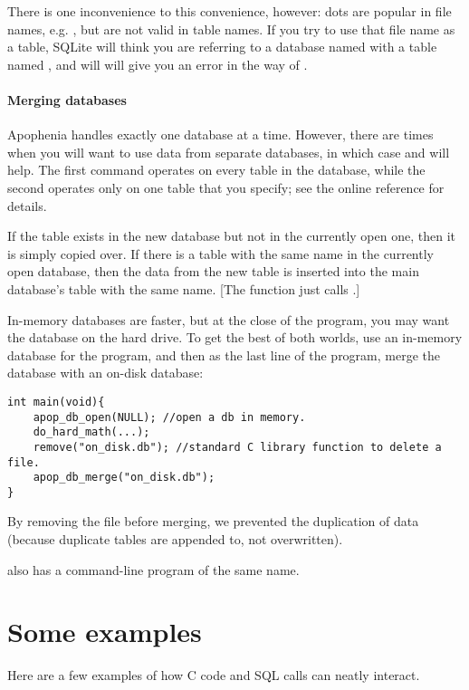 There is one inconvenience to this convenience, however: dots are popular
in file names, e.g. , but are not valid in table names. If
you try to use that file name as a table, SQLite will think you are
referring to a database named  with a table named ,
and will will give you an error in the way of .

\paragraph{Merging databases} Apophenia handles exactly one database at
a time. However, there are times when you will want to use data
from separate databases, in which case  and
 will help.  The first command
operates on every table in the database, while the second operates only
on one table that you specify; see the online reference for details.

If the table exists in the new database but not in the currently open
one, then it is simply copied over. If there is a table with the same
name in the currently open database, then the data from the new table is
inserted into the main database's table with the same name. [The function
just calls .]

In-memory databases are faster, but at the close of the program, you
may want the database on the hard drive. To get the best of both
worlds, use an in-memory database for the program, and then as the last
line of the program, merge the database with an on-disk database:
\begin{lstlisting}
int main(void){
    apop_db_open(NULL); //open a db in memory.
    do_hard_math(...);
    remove("on_disk.db"); //standard C library function to delete a file.
    apop_db_merge("on_disk.db");
}
\end{lstlisting}
By removing the file before merging, we prevented the duplication of
data (because duplicate tables are appended to, not overwritten).

 also has a command-line program of the
same name.

\section{Some examples} 
Here are a few examples of how C code and SQL calls can neatly interact.

